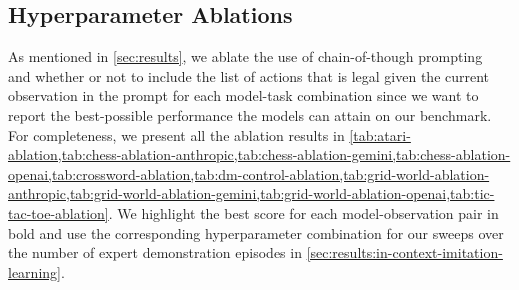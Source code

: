 \documentclass{article}
\begin{document}
\subsection{Hyperparameter Ablations}
\label{app:additional-results:ablations}
As mentioned in \cref{sec:results}, we ablate the use of chain-of-though prompting~\citep{wei2022chain} and whether or not to include the list of actions that is legal given the current observation in the prompt for each model-task combination since we want to report the best-possible performance the models can attain on our benchmark.
For completeness, we present all the ablation results in  \cref{tab:atari-ablation,tab:chess-ablation-anthropic,tab:chess-ablation-gemini,tab:chess-ablation-openai,tab:crossword-ablation,tab:dm-control-ablation,tab:grid-world-ablation-anthropic,tab:grid-world-ablation-gemini,tab:grid-world-ablation-openai,tab:tic-tac-toe-ablation}.
We highlight the best score for each model-observation pair in bold and use the corresponding hyperparameter combination for our sweeps over the number of expert demonstration episodes in \cref{sec:results:in-context-imitation-learning}.
\end{document}
